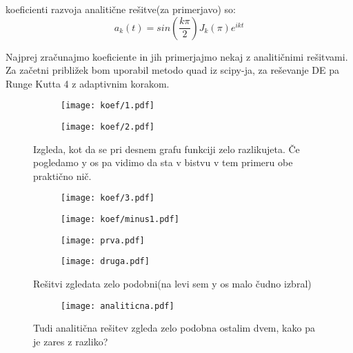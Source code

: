 \documentclass{article}
\begin{document}
koeficienti razvoja analitične rešitve(za primerjavo) so:
\begin{equation*}
a_k(t) = sin(\frac{k\pi}{2}) J_k(\pi) e^{ikt}
\end{equation*}

Najprej zračunajmo koeficiente in jih primerjajmo nekaj z analitičnimi rešitvami.
Za začetni približek bom uporabil metodo quad iz scipy-ja, za reševanje DE pa Runge Kutta 4 z adaptivnim korakom.

\begin{figure}[H]
\begin{subfigure}{.5\textwidth}
\texttt{[image: koef/1.pdf]}
\end{subfigure}
\begin{subfigure}{.5\textwidth}
\texttt{[image: koef/2.pdf]}
\end{subfigure}
\caption*{Izgleda, kot da se pri desnem grafu funkciji zelo razlikujeta. Če pogledamo y os pa vidimo da sta v bistvu v tem primeru obe praktično nič.}
\end{figure}

\begin{figure}[H]
\begin{subfigure}{.5\textwidth}
\texttt{[image: koef/3.pdf]}
\end{subfigure}
\begin{subfigure}{.5\textwidth}
\texttt{[image: koef/minus1.pdf]}
\end{subfigure}
\end{figure}

\begin{figure}[H]
\begin{subfigure}{.5\textwidth}
\texttt{[image: prva.pdf]}
\end{subfigure}
\begin{subfigure}{.5\textwidth}
\texttt{[image: druga.pdf]}
\end{subfigure}
\caption*{Rešitvi zgledata zelo podobni(na levi sem y os malo čudno izbral)}
\end{figure}

\begin{figure}[H]
\centering
\begin{subfigure}{.5\textwidth}
\texttt{[image: analiticna.pdf]}
\end{subfigure}
\caption*{Tudi analitična rešitev zgleda zelo podobna ostalim dvem, kako pa je zares z razliko?}
\end{figure}
\end{document}
